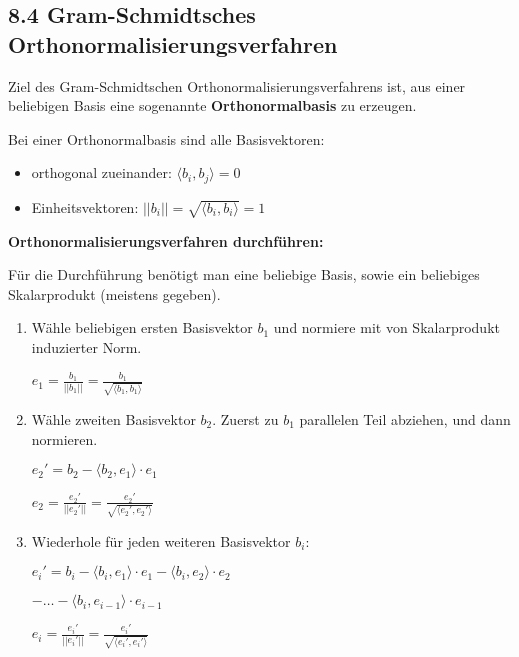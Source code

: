 \subsection{8.4 Gram-Schmidtsches Orthonormalisierungsverfahren}{
\vskip3pt

Ziel des Gram-Schmidtschen Orthonormalisierungsverfahrens ist, aus einer beliebigen Basis eine sogenannte \textbf{Orthonormalbasis} zu erzeugen. 
\vskip4pt

\colbreak
Bei einer Orthonormalbasis sind alle Basisvektoren:
\begin{itemize}[leftmargin=1cm, itemsep=0.5pt]
\item orthogonal zueinander: $\langle b_i, b_j \rangle = 0$
\item Einheitsvektoren: $||b_i|| = \sqrt{\langle b_i, b_i \rangle}= 1$
\end{itemize}
\vskip5pt

\textbf{Orthonormalisierungsverfahren durchführen:} \par \vskip2pt
Für die Durchführung benötigt man eine beliebige Basis, sowie ein beliebiges Skalarprodukt (meistens gegeben).
\vspace{-2pt}
\begin{center}
\begin{minipage}[t]{0.98 \columnwidth}
\begin{enumerate}[label=\protect\circled{\arabic*}]

\item Wähle beliebigen ersten Basisvektor $b_1$ und normiere mit von Skalarprodukt induzierter Norm. \par \vskip2pt
\hskip15pt $e_1 = \frac{b_1}{||b_1||} = \frac{b_1}{\sqrt{\langle b_1, b_1 \rangle}}$

\item Wähle zweiten Basisvektor $b_2$. Zuerst zu $b_1$ parallelen Teil abziehen, und dann normieren. \par \vskip2pt
\hskip15pt $e_2' = b_2 - \langle b_2, e_1 \rangle \cdot e_1$ \par
\hskip15pt $e_2 = \frac{e_2'}{||e_2'||} = \frac{e_2'}{\sqrt{\langle e_2', e_2' \rangle}}$

\item Wiederhole für jeden weiteren Basisvektor $b_i$: \par \vskip2pt
\hskip15pt $e_i' = b_i - \langle b_i, e_1 \rangle \cdot e_1 - \langle b_i, e_2 \rangle \cdot e_2$ \par
\hskip33pt $-\hdots - \langle b_i, e_{i-1} \rangle \cdot e_{i-1}$ \par
\hskip15pt $e_i = \frac{e_i'}{||e_i'||} = \frac{e_i'}{\sqrt{\langle e_i', e_i' \rangle}}$
\end{enumerate}
\end{minipage}
\end{center}


}
